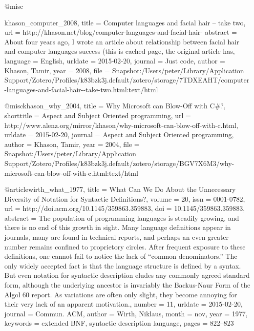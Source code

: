 @misc{khason_computer_2008,
  title    = {Computer languages and facial hair -- take two},
  url      = {http://khason.net/blog/computer-languages-and-facial-hair-%
  abstract = {About four years ago, I wrote an article about relationship between facial hair and computer languages success (this is cached page, the original article has},
  language = {English},
  urldate  = {2015-02-20},
  journal  = {Just code},
  author   = {Khason, Tamir},
  year     = {2008},
  file     = {Snapshot:/Users/peter/Library/Application Support/Zotero/Profiles/k83bzk3j.default/zotero/storage/7TDXEAHT/computer-languages-and-facial-hair-{\textendash}-take-two.html:text/html}
}

@misc{khason_why_2004,
  title      = {Why {Microsoft} can {Blow}-{Off} with {C}\#?},
  shorttitle = {Aspect and {Subject} {Oriented} programming},
  url        = {http://www.alenz.org/mirror/khason/why-microsoft-can-blow-off-with-c.html},
  urldate    = {2015-02-20},
  journal    = {Aspect and Subject Oriented programming},
  author     = {Khason, Tamir},
  year       = {2004},
  file       = {Snapshot:/Users/peter/Library/Application Support/Zotero/Profiles/k83bzk3j.default/zotero/storage/BGV7X6M3/why-microsoft-can-blow-off-with-c.html:text/html}
}

@article{wirth_what_1977,
  title    = {What {Can} {We} {Do} {About} the {Unnecessary} {Diversity} of {Notation} for {Syntactic} {Definitions}?},
  volume   = {20},
  issn     = {0001-0782},
  url      = {http://doi.acm.org/10.1145/359863.359883},
  doi      = {10.1145/359863.359883},
  abstract = {The population of programming languages is steadily growing, and there is no end of this growth in sight. Many language definitions appear in journals, many are found in technical reports, and perhaps an even greater number remains confined to proprietory circles. After frequent exposure to these definitions, one cannot fail to notice the lack of {\textquotedblleft}common denominators.{\textquotedblright} The only widely accepted fact is that the language structure is defined by a syntax. But even notation for syntactic description eludes any commonly agreed standard form, although the underlying ancestor is invariably the Backus-Naur Form of the Algol 60 report. As variations are often only slight, they become annoying for their very lack of an apparent motivation.},
  number   = {11},
  urldate  = {2015-02-20},
  journal  = {Commun. ACM},
  author   = {Wirth, Niklaus},
  month    = nov,
  year     = {1977},
  keywords = {extended BNF, syntactic description language},
  pages    = {822--823}
}

}
